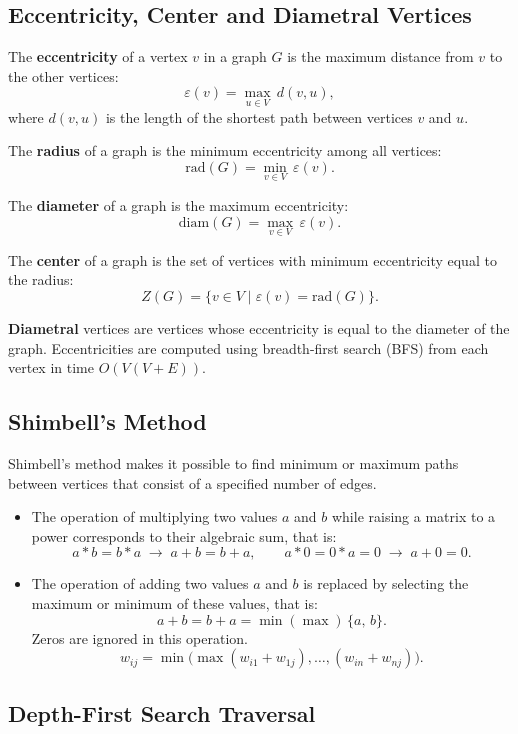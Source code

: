 \documentclass[a4paper,final]{article}
\begin{document}
	\subsection{Eccentricity, Center and Diametral Vertices}

The \textbf{eccentricity} of a vertex $v$ in a graph $G$ is the maximum distance from $v$ to the other vertices:
\[
\varepsilon(v) = \max_{u \in V}\, d(v, u),
\]
where $d(v, u)$ is the length of the shortest path between vertices $v$ and $u$.

The \textbf{radius} of a graph is the minimum eccentricity among all vertices:
\[
\mathrm{rad}(G) = \min_{v \in V}\, \varepsilon(v).
\]

The \textbf{diameter} of a graph is the maximum eccentricity:
\[
\mathrm{diam}(G) = \max_{v \in V}\, \varepsilon(v).
\]

The \textbf{center} of a graph is the set of vertices with minimum eccentricity equal to the radius:
\[
Z(G) = \{v \in V \mid \varepsilon(v) = \mathrm{rad}(G)\}.
\]

\textbf{Diametral} vertices are vertices whose eccentricity is equal to the diameter of the graph. Eccentricities are computed using breadth-first search (BFS) from each vertex in time $O(V(V+E))$.

	\subsection{Shimbell's Method}

Shimbell's method makes it possible to find minimum or maximum paths between vertices that consist of a specified number of edges.

\begin{itemize}
  \item The operation of multiplying two values $a$ and $b$ while raising a matrix to a power corresponds to their algebraic sum, that is:
  \[a * b = b * a \;\to\; a + b = b + a,\qquad a * 0 = 0 * a = 0 \;\to\; a + 0 = 0.\]
  \item The operation of adding two values $a$ and $b$ is replaced by selecting the maximum or minimum of these values, that is:
  \[a + b = b + a = \min(\max)\,\{a,\,b\}.\]
  Zeros are ignored in this operation.
  \[w_{ij} = \min\bigl(\max(w_{i1}+w_{1j}),\ldots,(w_{in}+w_{nj})\bigr).\]
\end{itemize}

	\subsection{Depth-First Search Traversal}
\end{document}
